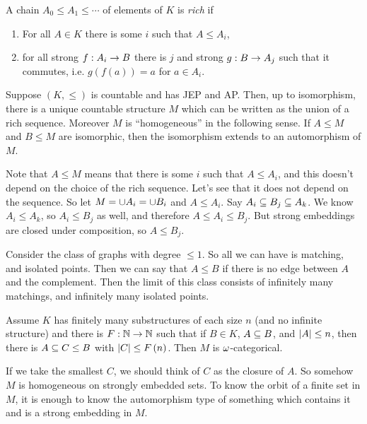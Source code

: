 \documentclass{amsart}
\begin{document}
\begin{defn}
A chain $A_0\leq A_1 \leq \cdots$ of elements of $K$ is \emph{rich} if 
\begin{enumerate}
\item For all $A\in K$ there is some $i$ such that $A\leq A_i$,
\item for all strong $f:A_i \rightarrow B$ there is $j$ and strong $g:B\rightarrow A_j$ such that
it commutes, i.e. $g\left( f\left( a \right) \right) = a$ for $a\in A_i$.
\end{enumerate}
\end{defn}

\begin{thm}
Suppose $\left( K , \leq \right)$ is countable and has JEP and AP. Then, up to isomorphism, there is
a unique countable structure $M$ which can be written as the union of a rich sequence.
Moreover $M$ is ``homogeneous'' in the following sense. If $A\leq M$ and $B\leq M$ are
isomorphic, then the isomorphism extends to an automorphism
of $M$.
\end{thm}

Note that $A\leq M$ means that there is some $i$ such that $A\leq A_i$, and this doesn't
depend on the choice of the rich sequence.
Let's see that it does not depend on the sequence. So let $M= \cup A_i = \cup B_i$ and
$A\leq A_i$. Say $A_i \subseteq B_j \subseteq A_k$. We know $A_i \leq A_k$, so $A_i \leq B_j$ as
well, and therefore $A\leq A_i \leq B_j$. But strong embeddings are closed under
composition, so $A\leq B_j$. 

\begin{exm}
Consider the class of graphs with degree $\leq 1$. 
So all we can have is matching, and isolated points. 
Then we can say that $A\leq B$ if there is no edge between $A$ and the complement.
Then the limit of this class consists of infinitely many matchings, and infinitely many
isolated points.
\label{exm:silly}
\end{exm}

\begin{rmk}
Assume $K$ has finitely many substructures of each size $n$ (and no infinite structure)
and there is $F: \mathbb{N} \rightarrow \mathbb{N}$ such that if $B\in K$, $A\subseteq B$, and $\left| A \right|\leq n$,
then there is $A\subseteq C\leq B$ with $\left| C \right|\leq F\left( n \right)$.
Then $M$ is $\omega$-categorical.
\end{rmk}

If we take the smallest $C$, we should think of $C$ as the closure of $A$.
So somehow $M$ is homogeneous on strongly embedded sets. 
To know the orbit of a finite set in $M$, it is enough to know the automorphism type of
something which contains it and is a strong embedding in $M$.
\end{document}
